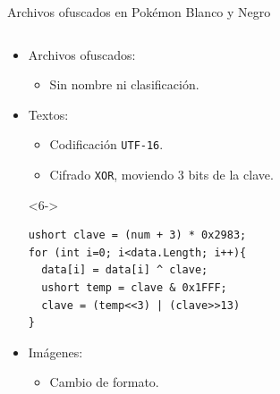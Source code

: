\begin{frame}[fragile]{Archivos ofuscados en Pokémon Blanco y Negro}
\begin{columns}
\begin{column}{0.75\textwidth}
    \begin{itemize}
        \item<1-> Archivos ofuscados:
        \begin{itemize}
            \item<3-> Sin nombre ni clasificación.
        \end{itemize}

        \item<4-> Textos:
        \begin{itemize}
            \item<5-> Codificación \texttt{UTF-16}.
            \item<6-> Cifrado \texttt{XOR}, moviendo 3 bits de la clave.
        \end{itemize}

    \begin{uncoverenv}<6->\begin{lstlisting}
ushort clave = (num + 3) * 0x2983;
for (int i=0; i<data.Length; i++){
  data[i] = data[i] ^ clave;
  ushort temp = clave & 0x1FFF;
  clave = (temp<<3) | (clave>>13)
}
    \end{lstlisting}\end{uncoverenv}

        \item<7-> Imágenes:
            \begin{itemize}
                \item<8-> Cambio de formato.
            \end{itemize}
    \end{itemize}
\end{column}
\end{columns}
\end{frame}

